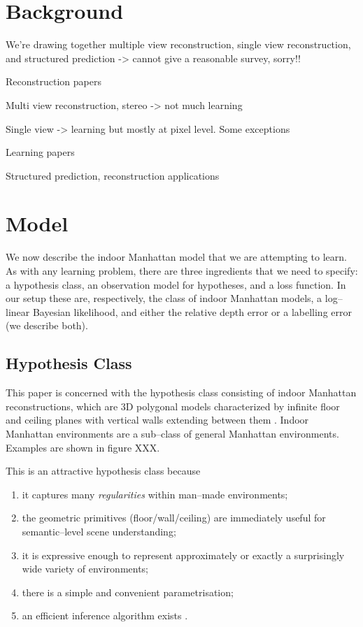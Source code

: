 \section{Background}
\label{sec:background}

We're drawing together multiple view reconstruction, single view
reconstruction, and structured prediction -> cannot give a reasonable
survey, sorry!!

Reconstruction papers

Multi view reconstruction, stereo -> not much learning

Single view -> learning but mostly at pixel level. Some exceptions

Learning papers

Structured prediction, reconstruction applications

\section{Model}
\label{sec:model}

We now describe the indoor Manhattan model that we are attempting to
learn. As with any learning problem, there are three ingredients that
we need to specify: a hypothesis class, an observation model for
hypotheses, and a loss function. In our setup these are, respectively,
the class of indoor Manhattan models, a log--linear Bayesian
likelihood, and either the relative depth error or a labelling error
(we describe both).

\subsection{Hypothesis Class}

This paper is concerned with the hypothesis class consisting of indoor
Manhattan reconstructions, which are 3D polygonal models characterized
by infinite floor and ceiling planes with vertical walls extending
between them \cite{Lee09,Flint10cvpr}. Indoor Manhattan environments
are a sub--class of general Manhattan environments. Examples are shown
in figure XXX.

This is an attractive hypothesis class because
\begin{enumerate}
\item{it captures many \textit{regularities} within man--made
  environments;}
\item{the geometric primitives (floor/wall/ceiling) are immediately
  useful for semantic--level scene understanding;}
\item{it is expressive enough to represent approximately or exactly
  a surprisingly wide variety of environments;}
\item{there is a simple and convenient parametrisation;}
\item{an efficient inference algorithm exists \cite{Flint10eccv}.}
\end{enumerate}

